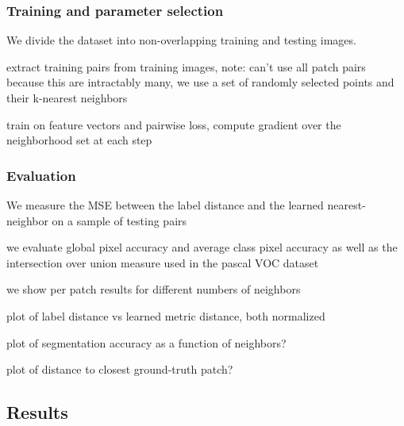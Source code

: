 \documentclass[a4paper,titlepage]{article}
\begin{document}

\subsubsection{Training and parameter selection}

We divide the dataset into non-overlapping training and testing images. 


extract training pairs from training images, note: can't use all patch pairs because this are intractably many, we use a set of randomly selected points and their k-nearest neighbors

train on feature vectors and pairwise loss, compute gradient over the neighborhood set at each step







\subsubsection{Evaluation}



We measure the \ac{MSE} between the label distance and the learned nearest-neighbor on a sample of testing pairs


we evaluate global pixel accuracy and average class pixel accuracy as well as the intersection over union measure used in the pascal VOC dataset

we show per patch results for different numbers of neighbors 

plot of label distance vs learned metric distance, both normalized\

plot of segmentation accuracy as a function of neighbors?

plot of distance to closest ground-truth patch?













\subsection{Results}

\end{document}
